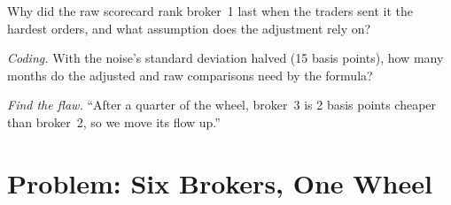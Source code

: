 \begin{exercise}[$\star\star$]\label{exo:mx:the-buy-side-trading-desk-and-its-brokers:6}
Why did the raw scorecard rank broker~1 last when the traders sent it the hardest orders, and what assumption does the adjustment rely on?
\end{exercise}

\begin{exercise}[$\star\star\star$]\label{exo:mx:the-buy-side-trading-desk-and-its-brokers:7}
\emph{Coding.} With the noise's standard deviation halved (15 basis points), how many months do the adjusted and raw comparisons need by the formula?
\end{exercise}

\begin{exercise}[$\star\star\star$]\label{exo:mx:the-buy-side-trading-desk-and-its-brokers:8}
\emph{Find the flaw.} ``After a quarter of the wheel, broker~3 is 2 basis points cheaper than broker~2, so we move its flow up.''
\end{exercise}

\section{Problem: Six Brokers, One Wheel}

